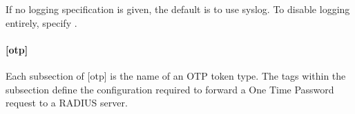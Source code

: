 \documentclass[letterpaper,10pt,english]{sphinxmanual}
\begin{document}
%
\begin{sphinxVerbatim}[commandchars=\\\{\}]
\PYG{p}{[}\PYG{p}{]}
      
      
      
      
\end{sphinxVerbatim}

If no logging specification is given, the default is to use syslog.
To disable logging entirely, specify .


\paragraph{{[}otp{]}}
\label{\detokenize{admin/conf_files/kdc_conf:otp}}\label{\detokenize{admin/conf_files/kdc_conf:id5}}
Each subsection of {[}otp{]} is the name of an OTP token type.  The tags
within the subsection define the configuration required to forward a
One Time Password request to a RADIUS server.
\end{document}
